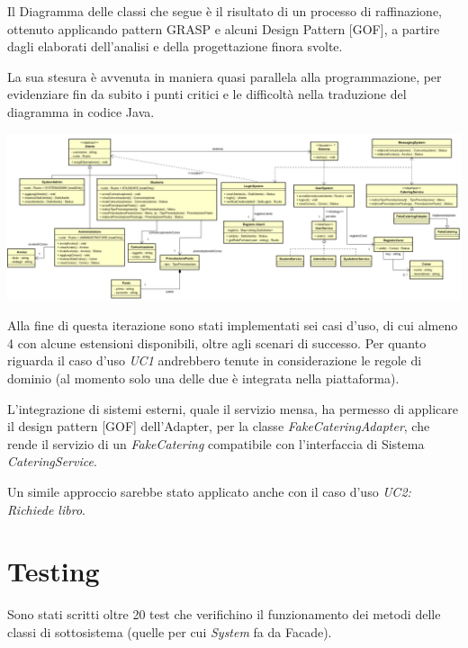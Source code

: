 \documentclass[12pt]{report}
\begin{document}
	Il Diagramma delle classi che segue è il risultato di un processo di raffinazione, ottenuto applicando pattern GRASP e alcuni Design Pattern [GOF], a partire dagli elaborati dell'analisi e della progettazione finora svolte.
	
	La sua stesura è avvenuta in maniera quasi parallela alla programmazione, per evidenziare fin da subito i punti critici e le difficoltà nella traduzione del diagramma in codice Java.	
	
	\begin{center}
				\includegraphics[scale= 0.6]{./images/DCD-I3.png}
	\end{center}

	Alla fine di questa iterazione sono stati implementati sei casi d'uso, di cui almeno 4 con alcune estensioni disponibili, oltre agli scenari di successo. Per quanto riguarda il caso d'uso \textit{UC1} andrebbero tenute in considerazione le regole di dominio (al momento solo una delle due è integrata nella piattaforma).
	
	L'integrazione di sistemi esterni, quale il servizio mensa,	ha permesso di applicare il design pattern [GOF] dell'Adapter, per la classe \textit{FakeCateringAdapter}, che rende il servizio di un \textit{FakeCatering} compatibile con l'interfaccia di Sistema \textit{CateringService}.
	
	Un simile approccio sarebbe stato applicato anche con il caso d'uso \textit{UC2: Richiede libro}.
	
	
	
	\newpage
	
	
	\section{Testing}
	
	Sono stati scritti oltre 20 test che verifichino il funzionamento dei metodi delle classi di sottosistema (quelle per cui \textit{System} fa da Facade).
	
\end{document}
